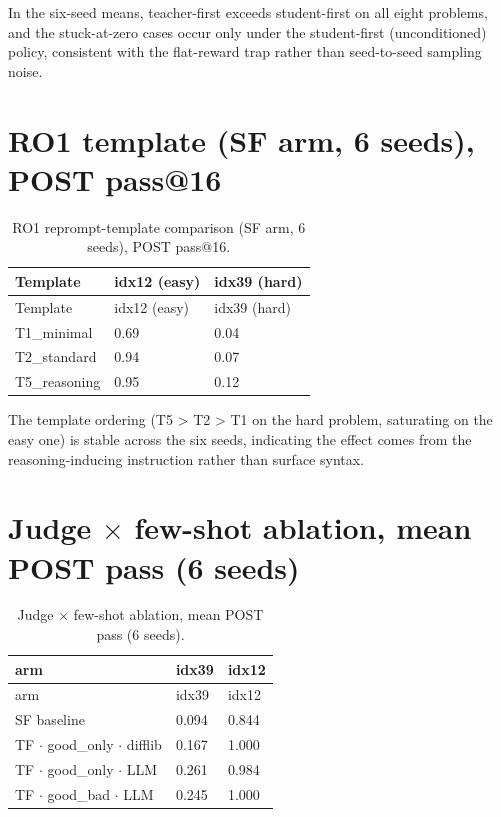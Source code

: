 \documentclass[12pt,a4paper]{report}
\begin{document}
In the six-seed means, teacher-first exceeds student-first on all eight problems, and the stuck-at-zero cases occur only under the student-first (unconditioned) policy, consistent with the flat-reward trap rather than seed-to-seed sampling noise.

\section{RO1 template (SF arm, 6 seeds), POST pass@16}\label{e.4-rq1-template-sf-arm-6-seeds-post-pass16}

\begin{longtable}{lll}
\caption{RO1 reprompt-template comparison (SF arm, 6 seeds), POST pass@16.}\\
\toprule
Template & idx12 (easy) & idx39 (hard) \\
\midrule
\endfirsthead
\toprule
Template & idx12 (easy) & idx39 (hard) \\
\midrule
\endhead
\bottomrule
\endfoot
T1\_minimal & 0.69 & 0.04 \\
T2\_standard & 0.94 & 0.07 \\
T5\_reasoning & 0.95 & 0.12 \\
\end{longtable}

The template ordering (T5 \textgreater{} T2 \textgreater{} T1 on the hard problem, saturating on the easy one) is stable across the six seeds, indicating the effect comes from the reasoning-inducing instruction rather than surface syntax.

\section{Judge $\times$ few-shot ablation, mean POST pass (6 seeds)}\label{e.5-judge-few-shot-ablation-mean-post-pass-6-seeds}

\begin{longtable}{lll}
\caption{Judge $\times$ few-shot ablation, mean POST pass (6 seeds).}\\
\toprule
arm & idx39 & idx12 \\
\midrule
\endfirsthead
\toprule
arm & idx39 & idx12 \\
\midrule
\endhead
\bottomrule
\endfoot
SF baseline & 0.094 & 0.844 \\
TF $\cdot$ good\_only $\cdot$ difflib & 0.167 & 1.000 \\
TF $\cdot$ good\_only $\cdot$ LLM & 0.261 & 0.984 \\
TF $\cdot$ good\_bad $\cdot$ LLM & 0.245 & 1.000 \\
\end{longtable}
\end{document}
